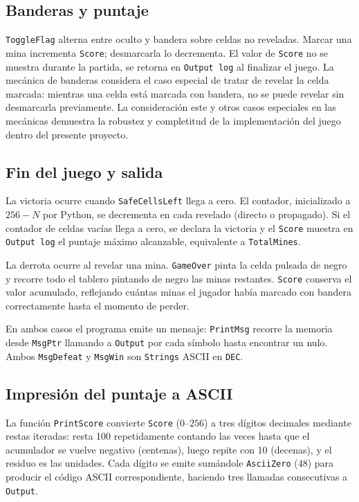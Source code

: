\documentclass[conference]{IEEEtran}
\begin{document}
\subsection{Banderas y puntaje}

\texttt{ToggleFlag} alterna entre oculto y bandera sobre celdas no reveladas. Marcar una mina incrementa \texttt{Score}; desmarcarla lo decrementa. El valor de \texttt{Score} no se muestra durante la partida, se retorna en \texttt{Output log} al finalizar el juego. La mecánica de banderas considera el caso especial de tratar de revelar la celda marcada: mientras una celda está marcada con bandera, no se puede revelar sin desmarcarla previamente. La consideración este y otros casos especiales en las mecánicas demuestra la robustez y completitud de la implementación del juego dentro del presente proyecto.

\subsection{Fin del juego y salida}

La victoria ocurre cuando \texttt{SafeCellsLeft} llega a cero. El contador, inicializado a $256-N$ por Python, se decrementa en cada revelado (directo o propagado). Si el contador de celdas vacías llega a cero, se declara la victoria y el \texttt{Score} muestra en \texttt{Output log} el puntaje máximo alcanzable, equivalente a \texttt{TotalMines}.

La derrota ocurre al revelar una mina. \texttt{GameOver} pinta la celda pulsada de negro y recorre todo el tablero pintando de negro las minas restantes. \texttt{Score} conserva el valor acumulado, reflejando cuántas minas el jugador había marcado con bandera correctamente hasta el momento de perder.

En ambos casos el programa emite un mensaje: \texttt{PrintMsg} recorre la memoria desde \texttt{MsgPtr} llamando a \texttt{Output} por cada símbolo hasta encontrar un nulo. Ambos \texttt{MsgDefeat} y \texttt{MsgWin} son \texttt{Strings} ASCII en \texttt{DEC}. 

\subsection{Impresión del puntaje a ASCII}

La función \texttt{PrintScore} convierte \texttt{Score} ($0$--$256$) a tres dígitos decimales mediante restas iteradas: resta 100 repetidamente contando las veces hasta que el acumulador se vuelve negativo (centenas), luego repite con 10 (decenas), y el residuo es las unidades. Cada dígito se emite sumándole \texttt{AsciiZero} ($48$) para producir el código ASCII correspondiente, haciendo tres llamadas consecutivas a \texttt{Output}.
\end{document}

